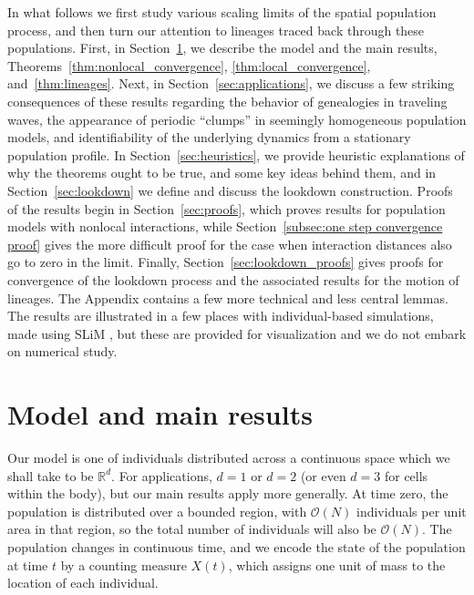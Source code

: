 \documentclass[EJP]{ejpecp} %
\newcommand{\IR}{\mathbb R}
\newcommand{\bigO}{\mathcal{O}}
\newcommand{\citep}[1]{\cite{#1}}
\begin{document}
In what follows we first study various scaling limits of the spatial population process,
and then turn our attention to lineages traced back through these populations.
First, in Section~\ref{sec: Model and main results},
we describe the model and the main results,
Theorems~\ref{thm:nonlocal_convergence}, \ref{thm:local_convergence}, and~\ref{thm:lineages}.
Next, in Section~\ref{sec:applications}, we discuss a few striking consequences of these results
regarding the behavior of genealogies in traveling waves,
the appearance of periodic ``clumps'' in seemingly homogeneous population models,
and identifiability of the underlying dynamics from a stationary population profile.
In Section~\ref{sec:heuristics}, we provide heuristic explanations
of why the theorems ought to be true,
and some key ideas behind them,
and in Section~\ref{sec:lookdown} we define and discuss the lookdown construction.
Proofs of the results begin in Section~\ref{sec:proofs},
which proves results for population models with nonlocal interactions,
while Section~\ref{subsec:one step convergence proof} gives the more difficult proof
for the case when interaction distances also go to zero in the limit.
Finally, Section~\ref{sec:lookdown_proofs} gives proofs for convergence of the lookdown process
and the associated results for the motion of lineages.
The Appendix contains a few more technical and less central lemmas.
The results are illustrated in a few places with individual-based simulations,
made using SLiM \citep{haller_slim_2019},
but these are provided for visualization and we do not embark on numerical study.



\section{Model and main results}
    \label{sec: Model and main results}

Our model is one of individuals distributed across a continuous space 
which we shall take to be $\IR^d$. 
For applications, $d=1$ or $d=2$
(or even $d=3$ for cells within the body),
but our main results apply more generally.
At time zero, the population is distributed over a bounded region, with 
$\bigO(N)$ individuals per unit area in that region,
so the total number of individuals will also be $\bigO(N)$.
The population changes in continuous time, and
we encode the state of the population at time $t$ by a counting measure $X(t)$,
which assigns one unit of mass to the location of each individual.
\end{document}
